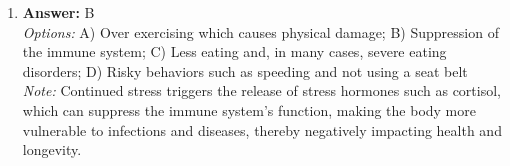 \documentclass[12pt]{article}
\begin{document}
\begin{enumerate}[label=\arabic*.]
\\ \textit{Note:} William Masters and Virginia Johnson are recognized for their pioneering research in the 1960 s that detailed the physiological stages of human sexual response through direct observation and measurement, establishing a foundational model in sexology.
\item \textbf{Answer:} B
\\ \textit{Options:} A) Over exercising which causes physical damage; B) Suppression of the immune system; C) Less eating and, in many cases, severe eating disorders; D) Risky behaviors such as speeding and not using a seat belt
\\ \textit{Note:} Continued stress triggers the release of stress hormones such as cortisol, which can suppress the immune system's function, making the body more vulnerable to infections and diseases, thereby negatively impacting health and longevity.
\end{enumerate}
\end{document}
